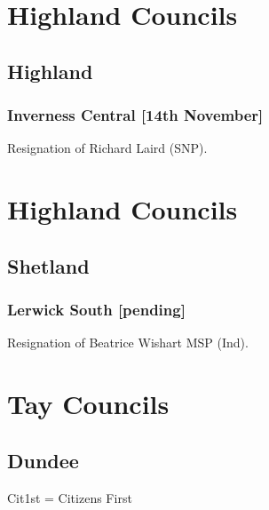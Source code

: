 \documentclass[a4paper,openany]{book}
\begin{document}
\begin{resultsiii}
\section{Highland Councils}

\subsection*{Highland}

\subsubsection*{Inverness Central \hspace*{\fill}\nolinebreak[1]%
	\enspace\hspace*{\fill}
	[14th November]}


Resignation of Richard Laird (SNP).

\section{Highland Councils}

\subsection*{Shetland}

\subsubsection*{Lerwick South \hspace*{\fill}\nolinebreak[1]%
	\enspace\hspace*{\fill}
	[pending]}


Resignation of Beatrice Wishart MSP (Ind).

\section{Tay Councils}

\subsection*{Dundee}

Cit1st = Citizens First


\end{resultsiii}
\end{document}
